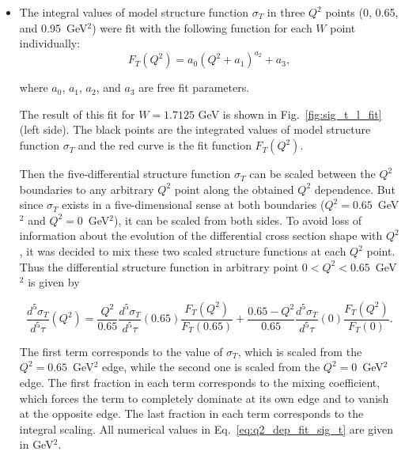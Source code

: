 \begin{itemize}

\item The integral values of model structure function $\sigma_T$ in three $Q^2$ points (0, 0.65, and 0.95~GeV$^2$) were fit with the following function for each $W$ point individually:
\begin{equation}
F_{T}(Q^2) = a_{0}\left (Q^2+a_1 \right )^{a_2}+a_{3},
\label{eq:q2_dep_fit_sig_t}
\end{equation}

where $a_{0}$, $a_{1}$, $a_{2}$, and $a_{3}$ are free fit parameters.

The result of this fit for $W = 1.7125$ GeV is shown in Fig.~\ref{fig:sig_t_l_fit} (left side). The black points are the integrated values of model structure function $\sigma_{T}$ and the red curve is the fit function $F_{T}(Q^2)$. 


Then the five-differential structure function $\sigma_{T}$ can be scaled between the $Q^2$ boundaries to any arbitrary $Q^2$ point along the obtained $Q^2$ dependence. But since $\sigma_{T}$ exists in a five-dimensional sense at both boundaries ($Q^2 = 0.65$~GeV$^2$ and $Q^2 = 0$~GeV$^2$), it can be scaled from both sides. To avoid loss of information about the evolution of the differential cross section shape with $Q^2$, it was decided to mix these two scaled structure functions at each $Q^2$ point. Thus the differential structure function in arbitrary point $0 < Q^2 < 0.65$~GeV$^2$ is given by

\begin{equation}
\frac{d^5\sigma_{T}}{d^5\tau}\left ( Q^2 \right ) = \frac{Q^2}{0.65}\frac{d^5\sigma_{T}}{d^5\tau}\left ( 0.65 \right )\frac{F_{T}(Q^2)}{F_{T}(0.65)}+\frac{0.65-Q^2}{0.65}\frac{d^5\sigma_{T}}{d^5\tau}\left ( 0 \right )\frac{F_{T}(Q^2)}{F_{T}(0)}.
\label{eq:q2_dep_fit_sig_t}
\end{equation}

The first term corresponds to the value of $\sigma_{T}$, which is scaled from the $Q^2=0.65$~GeV$^2$ edge, while the second one is scaled from the $Q^2 = 0$~GeV$^2$ edge. The first fraction in each term corresponds to the mixing coefficient, which forces the term to completely dominate at its own edge and to vanish at the opposite edge. The last fraction in each term corresponds to the integral scaling. All numerical values in Eq.~\eqref{eq:q2_dep_fit_sig_t} are given in GeV$^2$.


\end{itemize}
